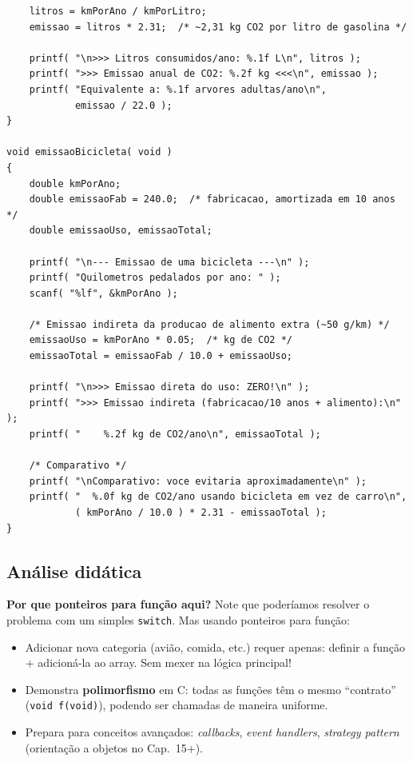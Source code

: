 \documentclass[12pt,a4paper]{article}
\begin{document}
\begin{respostabox}
\begin{lstlisting}
    litros = kmPorAno / kmPorLitro;
    emissao = litros * 2.31;  /* ~2,31 kg CO2 por litro de gasolina */

    printf( "\n>>> Litros consumidos/ano: %.1f L\n", litros );
    printf( ">>> Emissao anual de CO2: %.2f kg <<<\n", emissao );
    printf( "Equivalente a: %.1f arvores adultas/ano\n",
            emissao / 22.0 );
}

void emissaoBicicleta( void )
{
    double kmPorAno;
    double emissaoFab = 240.0;  /* fabricacao, amortizada em 10 anos */
    double emissaoUso, emissaoTotal;

    printf( "\n--- Emissao de uma bicicleta ---\n" );
    printf( "Quilometros pedalados por ano: " );
    scanf( "%lf", &kmPorAno );

    /* Emissao indireta da producao de alimento extra (~50 g/km) */
    emissaoUso = kmPorAno * 0.05;  /* kg de CO2 */
    emissaoTotal = emissaoFab / 10.0 + emissaoUso;

    printf( "\n>>> Emissao direta do uso: ZERO!\n" );
    printf( ">>> Emissao indireta (fabricacao/10 anos + alimento):\n" );
    printf( "    %.2f kg de CO2/ano\n", emissaoTotal );

    /* Comparativo */
    printf( "\nComparativo: voce evitaria aproximadamente\n" );
    printf( "  %.0f kg de CO2/ano usando bicicleta em vez de carro\n",
            ( kmPorAno / 10.0 ) * 2.31 - emissaoTotal );
}
\end{lstlisting}
\end{respostabox}

\subsection*{Análise didática}

\begin{boaprática}
\textbf{Por que ponteiros para função aqui?} Note que poderíamos resolver o
problema com um simples \texttt{switch}. Mas usando ponteiros para função:

\begin{itemize}[noitemsep]
  \item Adicionar nova categoria (avião, comida, etc.) requer apenas: definir a
  função + adicioná-la ao array. Sem mexer na lógica principal!
  \item Demonstra \textbf{polimorfismo} em C: todas as funções têm o mesmo
  ``contrato'' (\texttt{void f(void)}), podendo ser chamadas de maneira uniforme.
  \item Prepara para conceitos avançados: \textit{callbacks}, \textit{event
  handlers}, \textit{strategy pattern} (orientação a objetos no Cap.~15+).
\end{itemize}
\end{boaprática}
\end{document}
